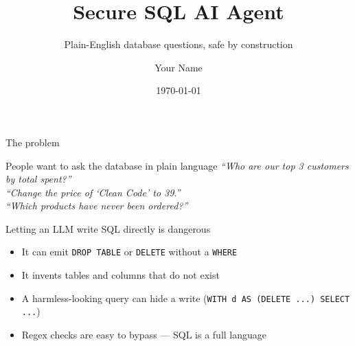 \documentclass[aspectratio=169,10pt]{beamer}
\title{Secure SQL AI Agent}
\subtitle{Plain-English database questions, safe by construction}
\author{Your Name}
\institute{Your Organisation}
\date{\today}
\begin{document}
\begin{frame}
  \titlepage
\end{frame}

\begin{frame}{The problem}
  \begin{block}{People want to ask the database in plain language}
    \emph{``Who are our top 3 customers by total spent?''}\\
    \emph{``Change the price of `Clean Code' to 39.''}\\
    \emph{``Which products have never been ordered?''}
  \end{block}

  \begin{alertblock}{Letting an LLM write SQL directly is dangerous}
    \begin{itemize}
      \item It can emit \texttt{DROP TABLE} or \texttt{DELETE} without a \texttt{WHERE}
      \item It invents tables and columns that do not exist
      \item A harmless-looking query can hide a write
            (\texttt{WITH d AS (DELETE ...) SELECT ...})
      \item Regex checks are easy to bypass --- SQL is a full language
    \end{itemize}
  \end{alertblock}
\end{frame}
\end{document}
